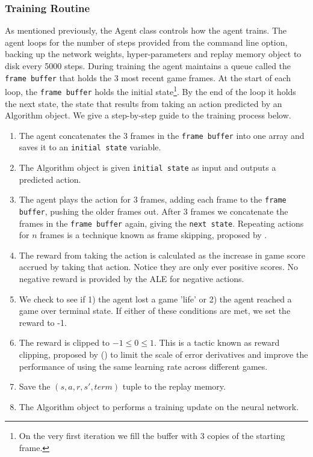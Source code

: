 \subsubsection{Training Routine}
As mentioned previously, the Agent class controls how the agent trains. The agent loops for the number of steps provided from the command line option, backing up the network weights, hyper-parameters and replay memory object to disk every 5000 steps. During training the agent maintains a queue called the \texttt{frame buffer} that holds the 3 most recent game frames. At the start of each loop, the \texttt{frame buffer} holds the initial state\footnote{On the very first iteration we fill the buffer with 3 copies of the starting frame.}. By the end of the loop it holds the next state, the state that results from taking an action predicted by an Algorithm object. We give a step-by-step guide to the training process below.
\begin{enumerate}
    \item The agent concatenates the 3 frames in the \texttt{frame buffer} into one array and saves it to an \texttt{initial state} variable.
    \item The Algorithm object is given \texttt{initial state} as input and outputs a predicted action.
    \item The agent plays the action for 3 frames, adding each frame to the \texttt{frame buffer}, pushing the older frames out. After 3 frames we concatenate the frames in the \texttt{frame buffer} again, giving the \texttt{next state}. Repeating actions for $n$ frames is a technique known as frame skipping, proposed by \citet{deepmind1}.
    \item The reward from taking the action is calculated as the increase in game score accrued by taking that action. Notice they are only ever positive scores. No negative reward is provided by the ALE for negative actions.
    \item We check to see if 1) the agent lost a game 'life' or 2) the agent reached a game over terminal state. If either of these conditions are met, we set the reward to -1.
    \item The reward is clipped to $-1 \leq 0 \leq 1$. This is a tactic known as reward clipping, proposed by (\citet{human}) to limit the scale of error derivatives and improve the performance of using the same learning rate across different games.
    \item Save the $(s, a, r, s', term)$ tuple to the replay memory.
    \item The Algorithm object to performs a training update on the neural network.
\end{enumerate}

